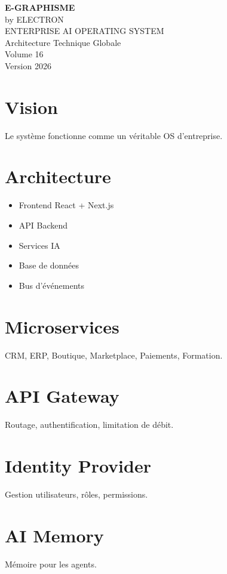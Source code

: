 \documentclass[12pt,a4paper,oneside]{book}
\begin{document}
\begin{titlepage}
\begin{center}
\vspace*{3cm}
{\Huge\bfseries\color{bleuIA}E-GRAPHISME}\\[0.3cm]
{\LARGE by ELECTRON}\\[2cm]
{\huge ENTERPRISE AI OPERATING SYSTEM}\\[0.3cm]
{\huge Architecture Technique Globale}\\[1cm]
{\Large Volume 16}\\[3cm]
{\Large Version 2026}
\end{center}
\end{titlepage}

\chapter{Vision}
Le système fonctionne comme un véritable OS d'entreprise.

\chapter{Architecture}
\begin{itemize}
\item Frontend React + Next.js
\item API Backend
\item Services IA
\item Base de données
\item Bus d'événements
\end{itemize}

\chapter{Microservices}
CRM, ERP, Boutique, Marketplace, Paiements, Formation.

\chapter{API Gateway}
Routage, authentification, limitation de débit.

\chapter{Identity Provider}
Gestion utilisateurs, rôles, permissions.

\chapter{AI Memory}
Mémoire pour les agents.
\end{document}
